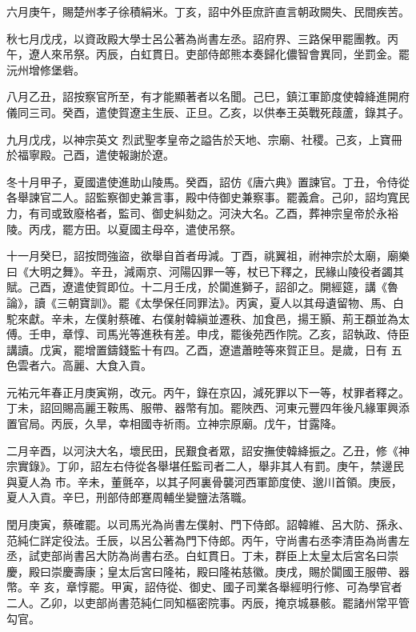 \begin{pinyinscope}
 六月庚午，賜楚州孝子徐積絹米。丁亥，詔中外臣庶許直言朝政闕失、民間疾苦。



 秋七月戊戌，以資政殿大學士呂公著為尚書左丞。詔府界、三路保甲罷團教。丙午，遼人來吊祭。丙辰，白虹貫日。吏部侍郎熊本奏歸化儂智會異同，坐罰金。罷沅州增修堡砦。



 八月乙丑，詔按察官所至，有才能顯著者以名聞。己巳，鎮江軍節度使韓絳進開府儀同三司。癸酉，遣使賀遼主生辰、正旦。乙亥，以供奉王英戰死葭蘆，錄其子。



 九月戊戌，以神宗英文
 烈武聖孝皇帝之謚告於天地、宗廟、社稷。己亥，上寶冊於福寧殿。己酉，遣使報謝於遼。



 冬十月甲子，夏國遣使進助山陵馬。癸酉，詔仿《唐六典》置諫官。丁丑，令侍從各舉諫官二人。詔監察御史兼言事，殿中侍御史兼察事。罷義倉。己卯，詔均寬民力，有司或致廢格者，監司、御史糾劾之。河決大名。乙酉，葬神宗皇帝於永裕陵。丙戌，罷方田。以夏國主母卒，遣使吊祭。



 十一月癸巳，詔按問強盜，欲舉自首者毋減。丁酉，祧翼祖，祔神宗於太廟，廟樂
 曰《大明之舞》。辛丑，減兩京、河陽囚罪一等，杖已下釋之，民緣山陵役者蠲其賦。己酉，遼遣使賀即位。十二月壬戌，於闐進獅子，詔卻之。開經筵，講《魯論》，讀《三朝寶訓》。罷《太學保任同罪法》。丙寅，夏人以其母遺留物、馬、白駝來獻。辛未，左僕射蔡確、右僕射韓縝並遷秩、加食邑，揚王顥、荊王頵並為太傅。壬申，章惇、司馬光等進秩有差。申戌，罷後苑西作院。乙亥，詔執政、侍臣講讀。戊寅，罷增置鑄錢監十有四。乙酉，遼遣蕭睦等來賀正旦。是歲，日有
 五色雲者六。高麗、大食入貢。



 元祐元年春正月庚寅朔，改元。丙午，錄在京囚，減死罪以下一等，杖罪者釋之。丁未，詔回賜高麗王鞍馬、服帶、器幣有加。罷陜西、河東元豐四年後凡緣軍興添置官局。丙辰，久旱，幸相國寺祈雨。立神宗原廟。戊午，甘露降。



 二月辛酉，以河決大名，壞民田，民艱食者眾，詔安撫使韓絳振之。乙丑，修《神宗實錄》。丁卯，詔左右侍從各舉堪任監司者二人，舉非其人有罰。庚午，禁邊民與夏人為
 市。辛未，董氈卒，以其子阿裏骨襲河西軍節度使、邈川首領。庚辰，夏人入貢。辛巳，刑部侍郎蹇周輔坐變鹽法落職。



 閏月庚寅，蔡確罷。以司馬光為尚書左僕射、門下侍郎。詔韓維、呂大防、孫永、范純仁詳定役法。壬辰，以呂公著為門下侍郎。丙午，守尚書右丞李清臣為尚書左丞，試吏部尚書呂大防為尚書右丞。白虹貫日。丁未，群臣上太皇太后宮名曰崇慶，殿曰崇慶壽康；皇太后宮曰隆祐，殿曰隆祐慈徽。庚戌，賜於闐國王服帶、器幣。辛
 亥，章惇罷。甲寅，詔侍從、御史、國子司業各舉經明行修、可為學官者二人。乙卯，以吏部尚書范純仁同知樞密院事。丙辰，掩京城暴骸。罷諸州常平管勾官。




\end{pinyinscope}
